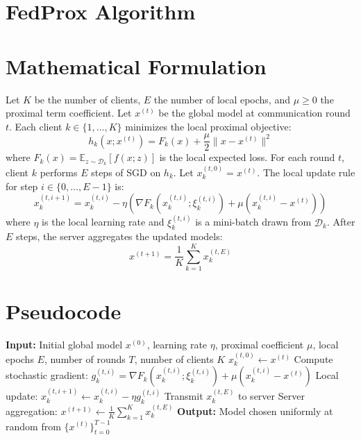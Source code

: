 \documentclass{article}
\begin{document}
\section*{FedProx Algorithm}
\section*{Mathematical Formulation}
Let $K$ be the number of clients, $E$ the number of local epochs, and $\mu \geq 0$ the proximal term coefficient. Let $x^{(t)}$ be the global model at communication round $t$. Each client $k \in \{1, \dots, K\}$ minimizes the local proximal objective:
\begin{equation}
h_k(x; x^{(t)}) = F_k(x) + \frac{\mu}{2} \|x - x^{(t)}\|^2
\end{equation}
where $F_k(x) = \mathbb{E}_{z \sim \mathcal{D}_k}[f(x; z)]$ is the local expected loss. For each round $t$, client $k$ performs $E$ steps of SGD on $h_k$. Let $x_k^{(t, 0)} = x^{(t)}$. The local update rule for step $i \in \{0, \dots, E-1\}$ is:
\begin{equation}
x_k^{(t, i+1)} = x_k^{(t, i)} - \eta \left( \nabla F_k(x_k^{(t, i)}; \xi_k^{(t, i)}) + \mu (x_k^{(t, i)} - x^{(t)}) \right)
\end{equation}
where $\eta$ is the local learning rate and $\xi_k^{(t, i)}$ is a mini-batch drawn from $\mathcal{D}_k$. After $E$ steps, the server aggregates the updated models:
\begin{equation}
x^{(t+1)} = \frac{1}{K} \sum_{k=1}^K x_k^{(t, E)}
\end{equation}

\section*{Pseudocode}
\begin{algorithmic}[1]
\State \textbf{Input:} Initial global model $x^{(0)}$, learning rate $\eta$, proximal coefficient $\mu$, local epochs $E$, number of rounds $T$, number of clients $K$
        \State $x_k^{(t, 0)} \gets x^{(t)}$
            \State Compute stochastic gradient: $g_k^{(t, i)} = \nabla F_k(x_k^{(t, i)}; \xi_k^{(t, i)}) + \mu (x_k^{(t, i)} - x^{(t)})$
            \State Local update: $x_k^{(t, i+1)} \gets x_k^{(t, i)} - \eta g_k^{(t, i)}$
        \EndFor
        \State Transmit $x_k^{(t, E)}$ to server
    \EndFor
    \State Server aggregation: $x^{(t+1)} \gets \frac{1}{K} \sum_{k=1}^K x_k^{(t, E)}$
\EndFor
\State \textbf{Output:} Model chosen uniformly at random from $\{x^{(t)}\}_{t=0}^{T-1}$
\end{algorithmic}
\end{document}
